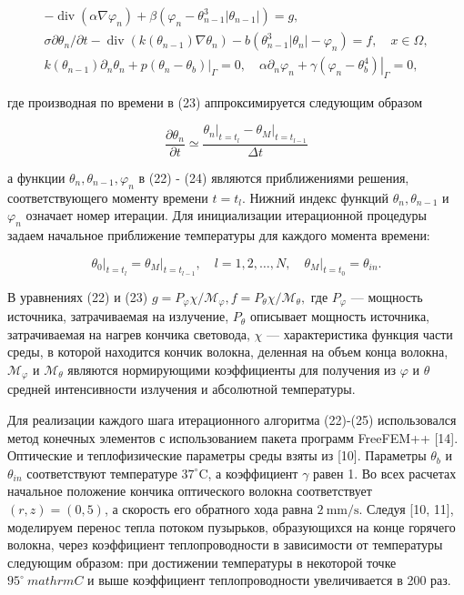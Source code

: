 $$
\begin{gathered}
    -\operatorname{div}\left(\alpha \nabla \varphi_{n}\right)
    +\beta\left(\varphi_{n}-\theta_{n-1}^{3}\left|\theta_{n-1}\right|\right)=g, \\
    \sigma \partial \theta_{n} / \partial t
    -\operatorname{div}\left(k\left(\theta_{n-1}\right) \nabla \theta_{n}\right)
    -b\left(\theta_{n-1}^{3}\left|\theta_{n}\right|-\varphi_{n}\right)=f, \quad x \in \Omega, \\
    k\left(\theta_{n-1}\right) \partial_{n} \theta_{n}+
    \left.p\left(\theta_{n}-\theta_{b}\right)\right|_{\Gamma}=0,
    \quad \alpha \partial_{n} \varphi_{n}+\left.\gamma\left(\varphi_{n}-\theta_{b}^{4}\right)\right|_{\Gamma}=0,
\end{gathered}
$$

где производная по времени в (23) аппроксимируется следующим образом

$$
\frac{\partial \theta_{n}}{\partial t} \simeq \frac{\left.\theta_{n}\right|_{t=t_{l}}
    -\left.\theta_{M}\right|_{t=t_{l-1}}}{\Delta t}
$$

а функции $\theta_{n}, \theta_{n-1}, \varphi_{n}$ в (22) - (24) являются приближениями решения,
соответствующего моменту времени $t=t_{l}$.
Нижний индекс функций $\theta_{n}, \theta_{n-1}$ и $\varphi_{n}$ означает номер итерации.
Для инициализации итерационной процедуры задаем начальное приближение температуры для каждого момента времени:

$$
\left.\theta_{0}\right|_{t=t_{l}}=\left.\theta_{M}\right|_{t=t_{l-1}},
\quad l=1,2, \ldots, N,\left.\quad \theta_{M}\right|_{t=t_{0}}=\theta_{i n}.
$$

В уравнениях (22) и (23)
$g=P_{\varphi} \chi / \mathcal{M}_{\varphi}, f=P_{\theta} \chi / \mathcal{M}_{ \theta},$
где $P_{\varphi}$ — мощность источника, затрачиваемая на излучение, $P_{\theta}$ описывает мощность источника,
затрачиваемая на нагрев кончика световода, $\chi$ — характеристика функция части среды,
в которой находится кончик волокна, деленная на объем конца волокна,
$\mathcal{M}_{\varphi}$ и $\mathcal{M}_{\theta}$ являются нормирующими коэффициенты для получения
из $\varphi$ и $\theta$ средней интенсивности излучения и абсолютной температуры.

Для реализации каждого шага итерационного алгоритма (22)-(25) использовался метод конечных
элементов с использованием пакета программ FreeFEM++ [14].
Оптические и теплофизические параметры среды взяты из [10].
Параметры $\theta_{b}$ и $\theta_{i n}$ соответствуют температуре $37^{\circ}\mathrm{C}$,
а коэффициент $\gamma$ равен 1.
Во всех расчетах начальное положение кончика оптического волокна соответствует
$(r, z)=(0,5)$, а скорость его обратного хода равна $2 \mathrm{~mm} / \mathrm{s}$.
Следуя [10, 11], моделируем перенос тепла потоком пузырьков, образующихся на конце горячего волокна,
через коэффициент теплопроводности в зависимости от температуры следующим образом:
при достижении температуры в некоторой точке $95^{\circ} \ mathrm{C}$ и выше коэффициент
теплопроводности увеличивается в 200 раз.

